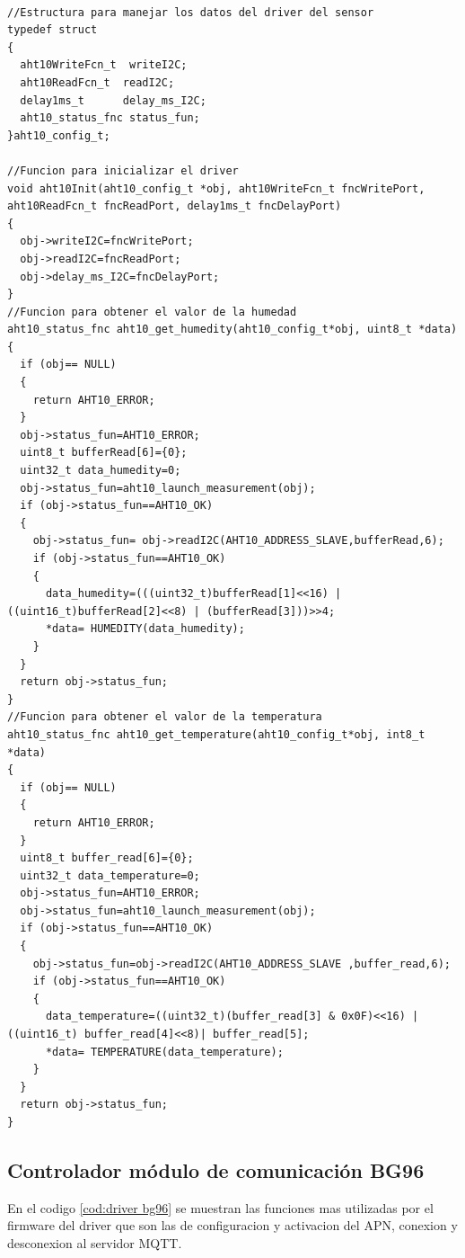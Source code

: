 \begin{lstlisting}[label=cod:codigo AHT10,caption=Funciones principales del driver del sensor AHT10.]  % Start your code-block

//Estructura para manejar los datos del driver del sensor    
typedef struct 
{
  aht10WriteFcn_t  writeI2C;
  aht10ReadFcn_t  readI2C;
  delay1ms_t      delay_ms_I2C;    
  aht10_status_fnc status_fun;
}aht10_config_t;

//Funcion para inicializar el driver 
void aht10Init(aht10_config_t *obj, aht10WriteFcn_t fncWritePort, aht10ReadFcn_t fncReadPort, delay1ms_t fncDelayPort)
{
  obj->writeI2C=fncWritePort;
  obj->readI2C=fncReadPort;
  obj->delay_ms_I2C=fncDelayPort;
}
//Funcion para obtener el valor de la humedad
aht10_status_fnc aht10_get_humedity(aht10_config_t*obj, uint8_t *data)
{
  if (obj== NULL)
  {
    return AHT10_ERROR;
  }
  obj->status_fun=AHT10_ERROR;
  uint8_t bufferRead[6]={0};
  uint32_t data_humedity=0;
  obj->status_fun=aht10_launch_measurement(obj);
  if (obj->status_fun==AHT10_OK)
  {
    obj->status_fun= obj->readI2C(AHT10_ADDRESS_SLAVE,bufferRead,6);
    if (obj->status_fun==AHT10_OK)
    {
      data_humedity=(((uint32_t)bufferRead[1]<<16) | ((uint16_t)bufferRead[2]<<8) | (bufferRead[3]))>>4;
      *data= HUMEDITY(data_humedity);
    }
  }
  return obj->status_fun;
}
//Funcion para obtener el valor de la temperatura 
aht10_status_fnc aht10_get_temperature(aht10_config_t*obj, int8_t *data)
{
  if (obj== NULL)
  {
    return AHT10_ERROR;
  } 
  uint8_t buffer_read[6]={0};
  uint32_t data_temperature=0;
  obj->status_fun=AHT10_ERROR;
  obj->status_fun=aht10_launch_measurement(obj);
  if (obj->status_fun==AHT10_OK)
  {
    obj->status_fun=obj->readI2C(AHT10_ADDRESS_SLAVE ,buffer_read,6);
    if (obj->status_fun==AHT10_OK)
    {
      data_temperature=((uint32_t)(buffer_read[3] & 0x0F)<<16) | ((uint16_t) buffer_read[4]<<8)| buffer_read[5];
      *data= TEMPERATURE(data_temperature);
    }
  }
  return obj->status_fun;
}
\end{lstlisting}


\subsection{ Controlador módulo de comunicación BG96 } 
En el codigo \ref{cod:driver bg96} se muestran las funciones mas utilizadas por el firmware del driver que son las de configuracion y activacion del APN, conexion y desconexion al servidor MQTT.

